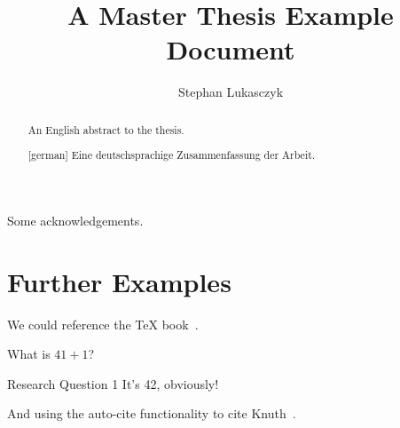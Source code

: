\documentclass[%
  chapterprefix=false,%
  open=right,%
  twoside=true,%
  paper=a4,%
  logofile={logo.pdf},%
  thesistype=master,%
  UKenglish,%
]{se2thesis}
\author{Stephan Lukasczyk}
\title{A Master Thesis Example Document}
\institute{Chair of Example}
\begin{document}
\frontmatter

\maketitle

\authorshipDeclaration

\begin{abstract}
  An English abstract to the thesis.
\end{abstract}

\begin{abstract}[german]
  Eine deutschsprachige Zusammenfassung der Arbeit.
\end{abstract}

\begin{acknowledgements}
  Some acknowledgements.
\end{acknowledgements}

\tableofcontents

\mainmatter

\blinddocument

\section{Further Examples}

We could reference the \TeX{} book~\autocite{Knu86}.

\begin{resq}
    What is \(41 + 1\)?
\end{resq}

\begin{summary}{Research Question 1}
   It's 42, obviously!
\end{summary}

And using the auto-cite functionality to cite Knuth~\autocite{Knu86}.

\backmatter

\printbibliography
\end{document}
